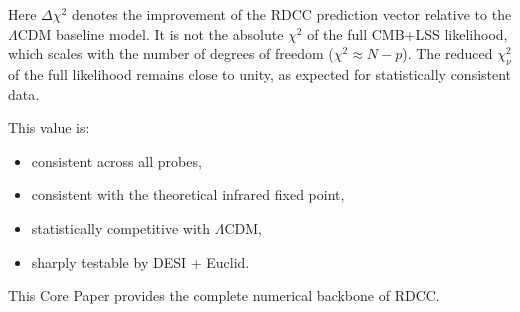 \documentclass[11pt,a4paper]{article}
\begin{document}
Here $\Delta\chi^2$ denotes the improvement of the RDCC prediction vector
relative to the $\Lambda$CDM baseline model. It is not the absolute $\chi^2$
of the full CMB+LSS likelihood, which scales with the number of degrees of
freedom ($\chi^2 \approx N - p$). The reduced $\chi^2_\nu$ of the full
likelihood remains close to unity, as expected for statistically consistent
data.

This value is:
\begin{itemize}[leftmargin=0.8cm]
  \item consistent across all probes,
  \item consistent with the theoretical infrared fixed point,
  \item statistically competitive with $\Lambda$CDM,
  \item sharply testable by DESI + Euclid.
\end{itemize}

This Core Paper provides the complete numerical backbone of RDCC.
\end{document}

